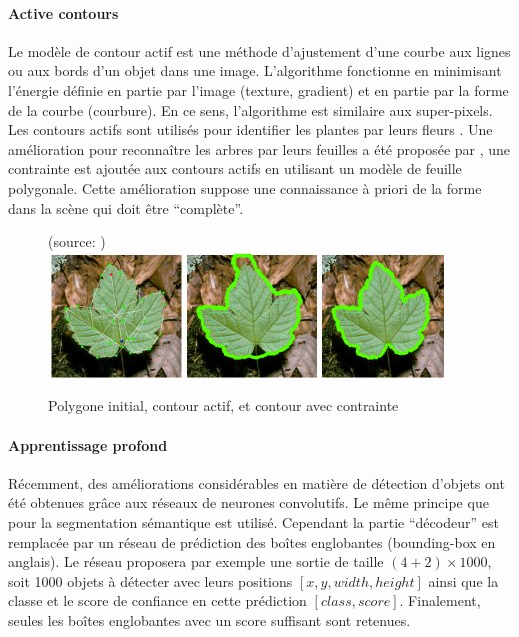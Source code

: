 \documentclass[../thesis.tex]{subfiles}
\begin{document}
    \paragraph{Active contours} Le modèle de contour actif est une méthode d'ajustement d'une courbe aux lignes ou aux bords d'un objet dans une image. L'algorithme fonctionne en minimisant l'énergie définie en partie par l'image (texture, gradient) et en partie par la forme de la courbe (courbure). En ce sens, l'algorithme est similaire aux super-pixels. Les contours actifs sont utilisés pour identifier les plantes par leurs fleurs \cite{MANH2001139, flower2012}. Une amélioration pour reconnaître les arbres par leurs feuilles a été proposée par \cite{Cerutti2011}, une contrainte est ajoutée aux contours actifs en utilisant un modèle de feuille polygonale. Cette amélioration suppose une connaissance à priori de la forme dans la scène qui doit être ``complète''.
    
    \begin{figure}[H]
        \centering
        {\scriptsize (source: \cite{Cerutti2011})} \\
        \includegraphics[width=0.7\linewidth]{img/biblio/segmentation-active-contour}
        \caption{Polygone initial, contour actif, et contour avec contrainte}
        \label{fig:03-segmentation-active-contour}
    \end{figure}
    
    
    \paragraph{Apprentissage profond} Récemment, des améliorations considérables en matière de détection d'objets ont été obtenues grâce aux réseaux de neurones convolutifs. Le même principe que pour la segmentation sémantique est utilisé. Cependant la partie ``décodeur'' est remplacée par un réseau de prédiction des boîtes englobantes (bounding-box en anglais). Le réseau proposera par exemple une sortie de taille $(4+2) \times 1000$, soit 1000 objets à détecter avec leurs positions $[x,y,width,height]$ ainsi que la classe et le score de confiance en cette prédiction $[class,score]$. Finalement, seules les boîtes englobantes avec un score suffisant sont retenues.
    
\end{document}
